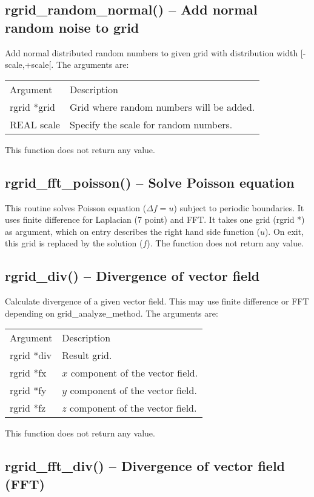 \documentclass[12pt,letterpaper]{report}
\begin{document}
\subsection{rgrid\_random\_normal() -- Add normal random noise to grid}

Add normal distributed random numbers to given grid with distribution width [-scale,+scale[. The arguments are:
\begin{longtable}{p{} p{}}
Argument & Description\\
\cline{1-2}
rgrid *grid & Grid where random numbers will be added.\\
REAL scale & Specify the scale for random numbers.\\
\end{longtable}
\noindent
This function does not return any value. 

\subsection{rgrid\_fft\_poisson() -- Solve Poisson equation}

This routine solves Poisson equation ($\Delta f = u$) subject to periodic boundaries. It
uses finite difference for Laplacian (7 point) and FFT. It takes one grid (rgrid *) as argument, which on entry describes the right hand side function ($u$). On exit, this grid is replaced by the solution ($f$). The function does not return any value.

\subsection{rgrid\_div() -- Divergence of vector field}

Calculate divergence of a given vector field. This may use finite difference or FFT depending on grid\_analyze\_method. The arguments are:
\begin{longtable}{p{} p{}}
Argument & Description\\
\cline{1-2}
rgrid *div & Result grid.\\
rgrid *fx  & $x$ component of the vector field.\\
rgrid *fy  & $y$ component of the vector field.\\
rgrid *fz  & $z$ component of the vector field.\\
\end{longtable}
\noindent
This function does not return any value. 

\subsection{rgrid\_fft\_div() -- Divergence of vector field (FFT)}
\end{document}
